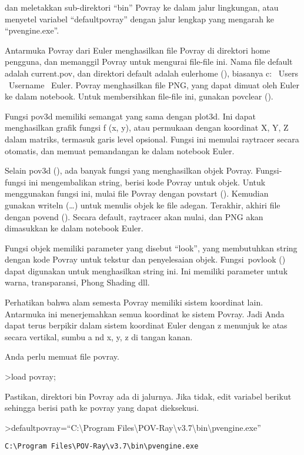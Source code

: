 \documentclass[
]{book}
\begin{document}
dan meletakkan sub-direktori ``bin'' Povray ke dalam jalur lingkungan, atau menyetel variabel ``defaultpovray'' dengan jalur lengkap yang mengarah ke ``pvengine.exe''.

Antarmuka Povray dari Euler menghasilkan file Povray di direktori home pengguna, dan memanggil Povray untuk mengurai file-file ini. Nama file default adalah current.pov, dan direktori default adalah eulerhome (), biasanya c: ~Users ~Username ~Euler. Povray menghasilkan file PNG, yang dapat dimuat oleh Euler ke dalam notebook. Untuk membersihkan file-file ini, gunakan povclear ().

Fungsi pov3d memiliki semangat yang sama dengan plot3d. Ini dapat menghasilkan grafik fungsi f (x, y), atau permukaan dengan koordinat X, Y, Z dalam matriks, termasuk garis level opsional. Fungsi ini memulai raytracer secara otomatis, dan memuat pemandangan ke dalam notebook Euler.

Selain pov3d (), ada banyak fungsi yang menghasilkan objek Povray. Fungsi-fungsi ini mengembalikan string, berisi kode Povray untuk objek. Untuk menggunakan fungsi ini, mulai file Povray dengan povstart (). Kemudian gunakan writeln (\ldots) untuk menulis objek ke file adegan. Terakhir, akhiri file dengan povend (). Secara default, raytracer akan mulai, dan PNG akan dimasukkan ke dalam notebook Euler.

Fungsi objek memiliki parameter yang disebut ``look'', yang membutuhkan string dengan kode Povray untuk tekstur dan penyelesaian objek. Fungsi~povlook () dapat digunakan untuk menghasilkan string ini. Ini memiliki parameter untuk warna, transparansi, Phong Shading dll.

Perhatikan bahwa alam semesta Povray memiliki sistem koordinat lain. Antarmuka ini menerjemahkan semua koordinat ke sistem Povray. Jadi Anda dapat terus berpikir dalam sistem koordinat Euler dengan z menunjuk ke atas secara vertikal, sumbu a nd x, y, z di tangan kanan.

Anda perlu memuat file povray.

\textgreater load povray;

Pastikan, direktori bin Povray ada di jalurnya. Jika tidak, edit variabel berikut sehingga berisi path ke povray yang dapat dieksekusi.

\textgreater defaultpovray=``C:\textbackslash Program Files\textbackslash POV-Ray\textbackslash v3.7\textbackslash bin\textbackslash pvengine.exe''

\begin{verbatim}
C:\Program Files\POV-Ray\v3.7\bin\pvengine.exe
\end{verbatim}
\end{document}
